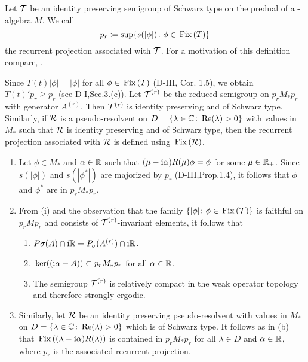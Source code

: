 Let $\mathcal{T}$ be an identity preserving semigroup of Schwarz type on the predual of a \WA-algebra $M$.
We call
\[
p_{r} \coloneqq \sup\{s(|\phi|) \colon \phi \in \mathop{}\mathrm{Fix}\left(T\right)\}
\]
the recurrent projection associated with $\mathcal{T}$.
For a motivation of this definition compare, \eg \citet[Section 6.3]{davies:1976}.

Since $T(t)|\phi| = |\phi|$ for all $\phi \in \mathop{}\mathrm{Fix}\left(T\right)$ (D-III, Cor. 1.5), we obtain $T(t)'p_{r} \geq p_{r}$ (see D-I,Sec.3.(c)).
Let $\mathcal{T}^{(r)}$ be the reduced semigroup on $p_{r}M_{*}p_{r}$ with generator $A^{(r)}$.
Then $\mathcal{T}^{(r)}$ is identity preserving and of Schwarz type.
Similarly, if $\mathcal{R}$ is a pseudo-resolvent on $D = \{\lambda \in \mathbb{C} \colon \mathop{}\!\mathrm{Re}(\lambda) > 0\}$ with values in $M_{*}$ such that $\mathcal{R}$ is identity preserving and of Schwarz type, then the recurrent projection associated with $\mathcal{R}$ is defined using $\mathop{}\mathrm{Fix}\left(\mathcal{R}\right)$.
\begin{remark}\label{rem:d4-3.2}
\begin{enumerate}[\upshape (i), wide, labelindent=.5em]

\item\label{item:d4-3.2-i}
Let $\phi \in M_{*}$ and $\alpha \in \mathbb{R}$ such that $(\mu - \mathrm{i}\alpha)R(\mu)\phi = \phi$ for some $\mu \in \mathbb{R}_{+}$.
Since $s(|\phi|)$ and $s(|\phi^{*}|)$ are majorized by $p_{r}$ (D-III,Prop.1.4), it follows that $\phi$ and $\phi^{*}$ are in $p_{r}M_{*}p_{r}$.

\item\label{item:d4-3.2-ii}
From (i) and the observation that the family $\{|\phi| \colon \phi \in \mathop{}\mathrm{Fix}\left(\mathcal{T}\right)\}$ is
faithful on $p_{r}Mp_{r}$ and consists of $\mathcal{T}^{(r)}$-invariant elements, it follows that
\begin{enumerate}[--]
\item
$P\sigma(A) \cap \mathrm{i}\mathbb{R} = P_{\sigma}(A^{(r)}) \cap \mathrm{i}\mathbb{R}$.

\item
$\mathop{}\mathrm{ker}((\mathrm{i}\alpha - A)) \subset p_{r}M_{*}p_{r}$ for all $\alpha \in \mathbb{R}$.

\item
The semigroup $\mathcal{T}^{(r)}$ is relatively compact in the weak operator topology and therefore strongly ergodic.
\end{enumerate}


\item\label{item:d4-3.2-iii}
Similarly, let $\mathcal{R}$ be an identity preserving pseudo-resolvent with values in $M_{*}$ on $D = \{\lambda \in \mathbb{C} \colon \mathop{}\!\mathrm{Re}(\lambda) > 0\}$ which is of Schwarz type.
It follows as in (b) that 
$\mathop{}\mathrm{Fix}\left((\lambda - \mathrm{i}\alpha)R(\lambda)\right)$ 
is contained in $p_{r}M_{*}p_{r}$ for all $\lambda \in D$ and $\alpha \in \mathbb{R}$, where $p_{r}$ is the associated recurrent projection.
\end{enumerate}
\end{remark}
